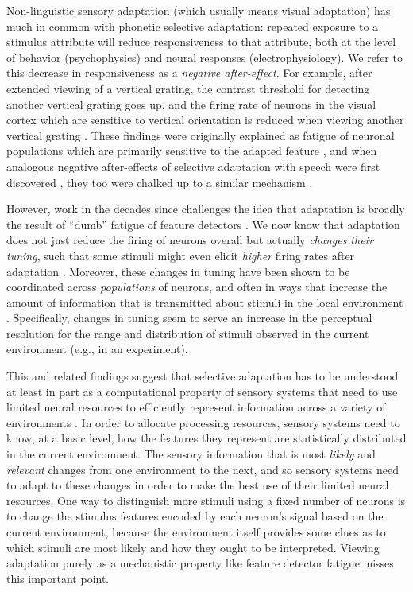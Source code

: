 Non-linguistic sensory adaptation (which usually means visual adaptation) has much in common with phonetic selective adaptation: repeated exposure to a stimulus attribute will reduce responsiveness to that attribute, both at the level of behavior (psychophysics) and neural responses (electrophysiology).  We refer to this decrease in responsiveness as a \emph{negative after-effect}.  For example, after extended viewing of a vertical grating, the contrast threshold for detecting another vertical grating goes up, and the firing rate of neurons in the visual cortex which are sensitive to vertical orientation is reduced when viewing another vertical grating \cite[cf.][]{Kohn2007}.  These findings were originally explained as fatigue of neuronal populations which are primarily sensitive to the adapted feature \cite{Blakemore1969}, and when analogous negative after-effects of selective adaptation with speech were first discovered \cite{Eimas1973}, they too were chalked up to a similar mechanism \autocite[although not without debate, some of which we revisit below; e.g., ][]{Cole1975,Ainsworth1977}.

However, work in the decades since challenges the idea that adaptation is broadly the result of ``dumb'' fatigue of feature detectors \cite{Kohn2007,Webster2005}.  We now know that adaptation does not just reduce the firing of neurons overall but actually \emph{changes their tuning}, such that some stimuli might even elicit \emph{higher} firing rates after adaptation \cite{Dragoi2000,Gutfreund2012,Kohn2004}.  Moreover, these changes in tuning have been shown to be coordinated across \emph{populations} of neurons, and often in ways that increase the amount of information that is transmitted about stimuli in the local environment \cite{Brenner2000,Fairhall2001,Gutnisky2008,Sharpee2006}.  Specifically, changes in tuning seem to serve an increase in the perceptual resolution for the range and distribution of stimuli observed in the current environment (e.g., in an experiment).

This and related findings suggest that selective adaptation has to be understood at least in part as a computational property of sensory systems that need to use limited neural resources to efficiently represent information across a variety of environments \cite{Brenner2000,Fairhall2001,Gutnisky2008,Kohn2007,Sharpee2006,Wainwright1999,Webster2005}. In order to allocate processing resources, sensory systems need to know, at a basic level, how the features they represent are statistically distributed in the current environment. The sensory information that is most \emph{likely} and \emph{relevant} changes from one environment to the next, and so sensory systems need to adapt to these changes in order to make the best use of their limited neural resources.  One way to distinguish more stimuli using a fixed number of neurons is to change the stimulus features encoded by each neuron's signal based on the current environment, because the environment itself provides some clues as to which stimuli are most likely and how they ought to be interpreted. Viewing adaptation purely as a mechanistic property like feature detector fatigue misses this important point.

